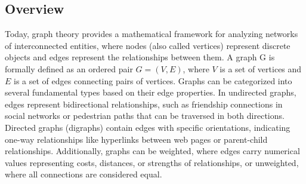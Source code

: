 \subsection*{Overview}
Today, graph theory provides a mathematical framework for analyzing networks of interconnected entities, where nodes (also called vertices) represent discrete objects and edges represent the relationships between them. A graph G is formally defined as an ordered pair $G = (V,E)$, where $V$ is a set of vertices and $E$ is a set of edges connecting pairs of vertices. Graphs can be categorized into several fundamental types based on their edge properties. In \gls{undirected graphs}, edges represent bidirectional relationships, such as friendship connections in social networks or pedestrian paths that can be traversed in both directions. \gls{Directed graphs} (digraphs) contain edges with specific orientations, indicating one-way relationships like hyperlinks between web pages or parent-child relationships. Additionally, graphs can be weighted, where edges carry numerical values representing costs, distances, or strengths of relationships, or unweighted, where all connections are considered equal.

